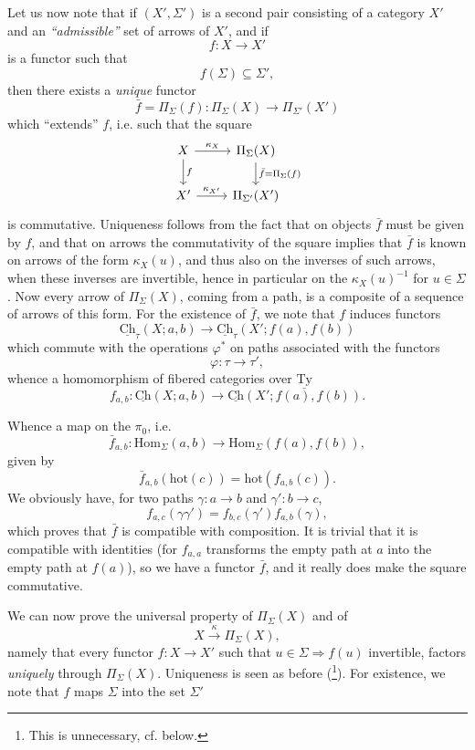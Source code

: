 \documentclass[11pt]{article}
\newcommand{\printedpage}[1]{\marginpar{\footnotesize p.~#1}}
\newcommand{\msp}[1]{\marginpar{\footnotesize [#1]}}
\newcommand{\Ch}{\underline{\mathrm{Ch}}}
\newcommand{\uTy}{\underline{\mathrm{Ty}}}
\newcommand{\Hom}{\mathrm{Hom}}
\newcommand{\hot}{\mathrm{hot}}
\begin{document}
Let us now note that if $(X', \Sigma')$ is a second pair consisting of a category $X'$ and an \textit{``admissible''} set of arrows of $X'$, and if
\[
f : X \longrightarrow X'
\]
is a functor such that
\[
f(\Sigma) \subseteq \Sigma',
\]
then there exists a \textit{unique} functor
\[
\bar{f} = \Pi_\Sigma(f) : \Pi_\Sigma(X) \longrightarrow \Pi_{\Sigma'}(X')
\]
which ``extends'' $f$, i.e. such that the square
\printedpage{48}
\msp{page 72}
\[
\begin{tikzcd}
X \arrow[r, "\kappa_X"] \arrow[d, "{\scriptstyle f}"] & \Pi_\Sigma(X) \arrow[d, "{\scriptstyle \bar{f} = \Pi_\Sigma(f)}"] \\
X' \arrow[r, "\kappa_{X'}"] & \Pi_{\Sigma'}(X')
\end{tikzcd}
\]
is commutative. Uniqueness follows from the fact that on objects $\bar{f}$ must be given by $f$, and that on arrows the commutativity of the square implies that $\bar{f}$ is known on arrows of the form $\kappa_X(u)$, and thus also on the inverses of such arrows, when these inverses are invertible, hence in particular on the $\kappa_X(u)^{-1}$ for $u \in \Sigma$. Now every arrow of $\Pi_\Sigma(X)$, coming from a path, is a composite of a sequence of arrows of this form. For the existence of $\bar{f}$, we note that $f$ induces functors %
\[
\Ch_\tau(X; a, b) \longrightarrow \Ch_\tau(X'; f(a), f(b))
\]
which commute with the operations $\varphi^*$ on paths associated with the functors
\[
\varphi : \tau \longrightarrow \tau',
\]
whence a homomorphism of fibered categories over $\uTy$
\[
f_{a,b} : \Ch(X; a, b) \longrightarrow \Ch(X'; f(a), f(b)).
\]

\msp{page 73}

Whence a map on the $\pi_0$, i.e.
\[
\bar{f}_{a,b} : \Hom_\Sigma(a,b) \longrightarrow \Hom_\Sigma(f(a), f(b)),
\]
given by
\[
\bar{f}_{a,b}(\hot(c)) = \hot(f_{a,b}(c)).
\]
We obviously have, for two paths $\gamma : a \longrightarrow b$ and $\gamma' : b \longrightarrow c$,
\[
f_{a,c}(\gamma\gamma') = f_{b,c}(\gamma')f_{a,b}(\gamma),
\]
which proves that $\bar{f}$ is compatible with composition. It is trivial that it is compatible with identities (for $f_{a,a}$ transforms the empty path at $a$ into the empty path at $f(a)$), so we have a functor $\bar{f}$, and it really does make the square commutative.

We can now prove the universal property of $\Pi_\Sigma(X)$ and of
\[
X \xrightarrow{\ \kappa\ } \Pi_\Sigma(X),
\]
namely that every functor $f : X \longrightarrow X'$ such that $u \in \Sigma \Longrightarrow f(u)$ invertible, factors \textit{uniquely} through $\Pi_\Sigma(X)$. Uniqueness is seen as before (\footnote[20]{This is unnecessary, cf. below.}). For existence, we note that $f$ maps $\Sigma$ into the set $\Sigma'$
\end{document}
